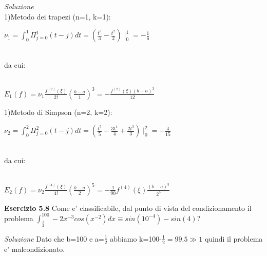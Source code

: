 \documentclass[20pt,a4paper]{book}
\begin{document}
\textit{Soluzione}
\\1)Metodo dei trapezi (n=1, k=1):

\begin{math}\nu_{1}=\int_{0}^{1}\Pi_{j=0}^{1}(t-j) dt=(\frac{t^{3}}{3}-\frac{t^{2}}{2})\mid_{0}^{1}=-\frac{1}{6} \end{math}

\\da cui:

\\\begin{math}E_{1}(f)=\nu_{1}\frac{f^{(2)}(\xi)}{2!}(\frac{b-a}{1})^{3}=-\frac{f^{(2)}(\xi)(b-a)^{3}}{12}\end{math}


\vspace{3mm}

1)Metodo di Simpson (n=2, k=2):


\begin{math}\nu_{2}=\int_{0}^{2}\Pi_{j=0}^{2}(t-j) dt=(\frac{t^{5}}{5}-\frac{3t^{4}}{4}+\frac{2t^{3}}{3})\mid_{0}^{2}=-\frac{4}{15} \end{math}

\\da cui:

\\\begin{math}E_{2}(f)=\nu_{2}\frac{f^{(4)}(\xi)}{4!}(\frac{b-a}{2})^{5}=-\frac{1}{90}f^{(4)}(\xi)\frac{(b-a)^{5}}{2^{5}}\end{math} 


\vspace{10mm}

\textbf{\Large{Esercizio 5.8}}
Come e' classificabile, dal punto di vista del condizionamento il problema \begin{math}\int_{\frac{1}{2}}^{100}-2x^{-3}cos(x^{-2})dx\equiv sin(10^{-4})-sin(4)\end{math}?

 
\textit{Soluzione}
Dato che b=100 e a=\begin{math}\frac{1}{2}\end{math} abbiamo k=100-\begin{math}\frac{1}{2}=99.5\gg 1\end{math} quindi il problema e' malcondizionato.


\vspace{10mm}
\end{document}
